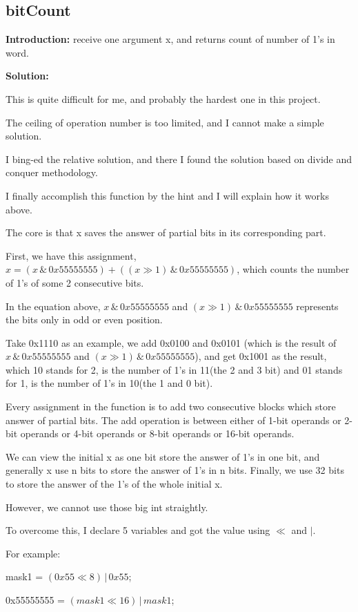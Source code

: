 \documentclass[12pt,a4paper]{article}
\theoremstyle{definition}
\numberwithin{equation}{section}
\numberwithin{figure}{section}
\begin{document}
\begin{spacing}{1.5}
\subsection{bitCount}
\textbf{Introduction: }receive one argument x, and returns count of number of 1's in word.\par
\textbf{Solution: }\par
This is quite difficult for me, and probably the hardest one in this project.\par
The ceiling of operation number is too limited, and I cannot make a simple solution.\par
I bing-ed the relative solution, and there I found the solution based on divide and conquer methodology.\par
I finally accomplish this function by the hint and I will explain how it works above.\par
The core is that x saves the answer of partial bits in its corresponding part.\par
First, we have this assignment, $x = \left(x\,\&\, 0x55555555\right) + \left(\left(x \gg 1\right)\,\&\, 0x55555555\right)$, which counts the number of 1's of some 2  consecutive bits.\par
In the equation above, $x\,\&\,0x55555555$ and $\left(x \gg 1\right)\,\&\, 0x55555555$ represents the bits only in odd or even position.\par
Take 0x1110 as an example, we add 0x0100 and 0x0101 (which is the result of $x\,\&\,0x55555555$ and $\left(x \gg 1\right)\,\&\, 0x55555555$), and get 0x1001 as the result, which 10 stands for 2, is the number of 1's in 11(the 2 and 3 bit) and 01 stands for 1, is the number of 1's in 10(the 1 and 0 bit).\par
Every assignment in the function is to add two consecutive blocks which store answer of partial bits. The add operation is between either of 1-bit operands or 2-bit operands or 4-bit operands or 8-bit operands or 16-bit operands.\par
We can view the initial x as one bit store the answer of 1's in one bit, and generally x use n bits to store the answer of 1's in n bits. Finally, we use 32 bits to store the answer of the 1's of the whole initial x.\par
However, we cannot use those big int straightly.\par
To overcome this, I declare 5 variables and got the value using $\ll$ and $\mid$.\par
For example:\par
mask1 = $\left(0x55 \ll 8\right)\,|\,0x55$;\par
0x55555555 = $\left(mask1 \ll 16\right)\,|\,mask1$;\par


\end{spacing}
\end{document}

